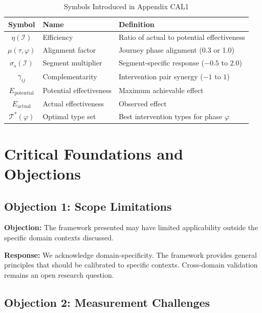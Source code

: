 \begin{table}[htbp]
\centering
\caption{Symbols Introduced in Appendix CAL1}
\label{tab:eih-symbols}
\renewcommand{\arraystretch}{1.3}
\begin{tabular}{@{}clp{6cm}@{}}
\toprule
\textbf{Symbol} & \textbf{Name} & \textbf{Definition} \\
\midrule
$\eta(\mathcal{I})$ & Efficiency & Ratio of actual to potential effectiveness \\
$\mu(\tau, \varphi)$ & Alignment factor & Journey phase alignment (0.3 or 1.0) \\
$\sigma_s(\mathcal{I})$ & Segment multiplier & Segment-specific response ($-0.5$ to $2.0$) \\
$\gamma_{ij}$ & Complementarity & Intervention pair synergy ($-1$ to $1$) \\
$E_{\text{potential}}$ & Potential effectiveness & Maximum achievable effect \\
$E_{\text{actual}}$ & Actual effectiveness & Observed effect \\
$\mathcal{T}^*(\varphi)$ & Optimal type set & Best intervention types for phase $\varphi$ \\
\bottomrule
\end{tabular}
\end{table}



\section{Critical Foundations and Objections}
\label{sec:eih-foundations}

\subsection{Objection 1: Scope Limitations}

\textbf{Objection:} The framework presented may have limited applicability
outside the specific domain contexts discussed.

\textbf{Response:} We acknowledge domain-specificity. The framework provides
general principles that should be calibrated to specific contexts. Cross-domain
validation remains an open research question.

\subsection{Objection 2: Measurement Challenges}

